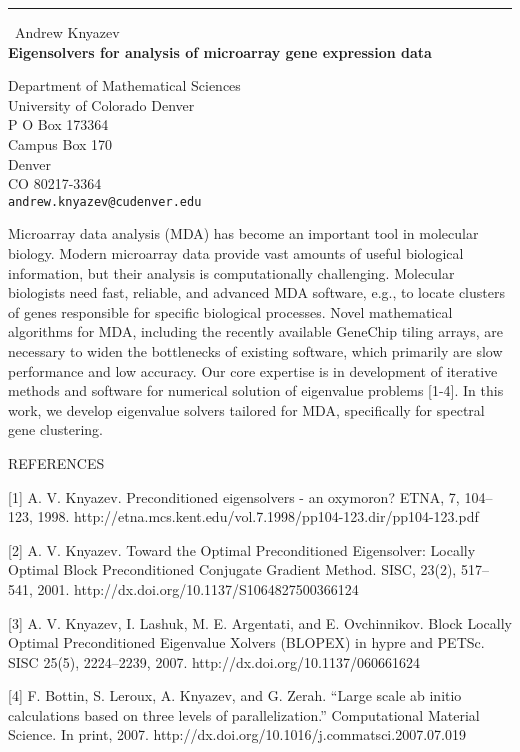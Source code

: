 \documentclass{report}
\begin{document}
\begin{center}
\rule{6in}{1pt} \
{\large Andrew Knyazev \\
{\bf Eigensolvers for analysis of microarray gene expression data}}

Department of Mathematical Sciences \\ University of Colorado Denver \\ P O Box 173364 \\ Campus Box 170 \\ Denver \\ CO 80217-3364
\\
{\tt andrew.knyazev@cudenver.edu}\end{center}

Microarray data analysis (MDA) has become an important tool in molecular
biology. Modern microarray data provide vast amounts of useful biological
information, but their analysis is computationally challenging. Molecular
biologists need fast, reliable, and advanced MDA software, e.g., to
locate clusters
of genes responsible for specific biological processes. Novel
mathematical algorithms for MDA, including the recently available
GeneChip tiling arrays, are necessary to widen the bottlenecks of
existing software, which primarily are slow performance and low accuracy.
Our core expertise is in development of iterative methods and software
for numerical solution of eigenvalue problems [1-4]. In this work, we
develop eigenvalue solvers tailored for MDA, specifically for spectral
gene clustering.

REFERENCES

[1] A. V. Knyazev. Preconditioned eigensolvers - an oxymoron? ETNA, 7,
104--123, 1998.
http://etna.mcs.kent.edu/vol.7.1998/pp104-123.dir/pp104-123.pdf

[2] A. V. Knyazev. Toward the Optimal Preconditioned Eigensolver: Locally
Optimal Block Preconditioned Conjugate Gradient Method. SISC, 23(2),
517--541, 2001. http://dx.doi.org/10.1137/S1064827500366124

[3] A. V. Knyazev, I. Lashuk, M. E. Argentati, and E. Ovchinnikov. Block
Locally Optimal Preconditioned Eigenvalue Xolvers (BLOPEX) in hypre and
PETSc. SISC 25(5), 2224--2239, 2007. http://dx.doi.org/10.1137/060661624

[4] F. Bottin, S. Leroux, A. Knyazev, and G. Zerah. “Large scale ab
initio calculations based on three levels of parallelization.”
Computational Material Science. In print, 2007.
http://dx.doi.org/10.1016/j.commatsci.2007.07.019
\end{document}
